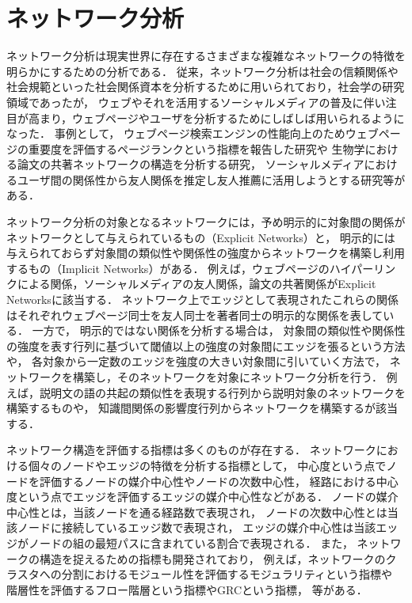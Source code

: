 \section{ネットワーク分析}
ネットワーク分析は現実世界に存在するさまざまな複雑なネットワークの特徴を明らかにするための分析である．
従来，ネットワーク分析は社会の信頼関係や社会規範といった社会関係資本を分析するために用いられており，社会学の研究領域であった\cite{putnam1993prosperous, coleman1994foundations}が，
ウェブやそれを活用するソーシャルメディアの普及に伴い注目が高まり，ウェブページやユーザを分析するためにしばしば用いられるようになった．
事例として，
ウェブページ検索エンジンの性能向上のためウェブページの重要度を評価するページランクという指標を報告した研究\cite{page1999pagerank}や
生物学における論文の共著ネットワークの構造を分析する研究\cite{sun2011co}，
ソーシャルメディアにおけるユーザ間の関係性から友人関係を推定し友人推薦に活用しようとする研究\cite{dong2012link}等がある．

ネットワーク分析の対象となるネットワークには，予め明示的に対象間の関係がネットワークとして与えられているもの（Explicit Networks）と，
明示的には与えられておらず対象間の類似性や関係性の強度からネットワークを構築し利用するもの（Implicit Networks）がある．
例えば，ウェブページのハイパーリンクによる関係，ソーシャルメディアの友人関係，論文の共著関係がExplicit Networksに該当する．
ネットワーク上でエッジとして表現されたこれらの関係はそれぞれウェブページ同士を友人同士を著者同士の明示的な関係を表している．
一方で，
明示的ではない関係を分析する場合は，
対象間の類似性や関係性の強度を表す行列に基づいて閾値以上の強度の対象間にエッジを張るという方法や，
各対象から一定数のエッジを強度の大きい対象間に引いていく方法で，
ネットワークを構築し，そのネットワークを対象にネットワーク分析を行う．
例えば，説明文の語の共起の類似性を表現する行列から説明対象のネットワークを構築するもの\cite{buzydlowski2002term}や，
知識間関係の影響度行列からネットワークを構築する\cite{piech2015deep}が該当する．


ネットワーク構造を評価する指標は多くのものが存在する．
ネットワークにおける個々のノードやエッジの特徴を分析する指標として，
中心度という点でノードを評価するノードの媒介中心性やノードの次数中心性，
経路における中心度という点でエッジを評価するエッジの媒介中心性などがある．
ノードの媒介中心性とは，当該ノードを通る経路数で表現され，
ノードの次数中心性とは当該ノードに接続しているエッジ数で表現され，
エッジの媒介中心性は当該エッジがノードの組の最短パスに含まれている割合で表現される．
また，
ネットワークの構造を捉えるための指標も開発されており，
例えば，ネットワークのクラスタへの分割におけるモジュール性を評価するモジュラリティという指標\cite{newman2006modularity}や
階層性を評価するフロー階層という指標\cite{luo2011detecting}やGRCという指標\cite{mones2012hierarchy}，
等がある．

